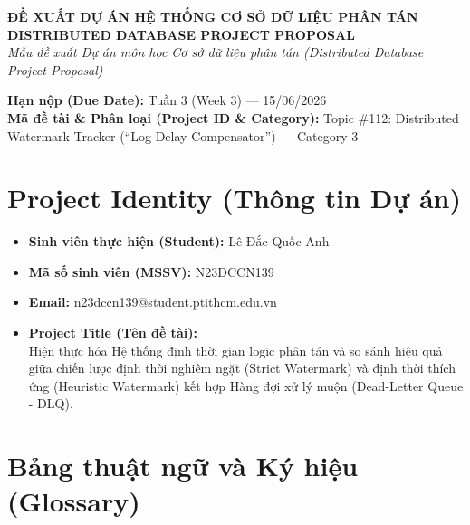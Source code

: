 \documentclass[12pt,a4paper]{article}
\begin{document}

\begin{center}
    \large\textbf{ĐỀ XUẤT DỰ ÁN HỆ THỐNG CƠ SỞ DỮ LIỆU PHÂN TÁN} \\[6pt]
    \Large\textbf{DISTRIBUTED DATABASE PROJECT PROPOSAL} \\[10pt]
    \small\textit{Mẫu đề xuất Dự án môn học Cơ sở dữ liệu phân tán (Distributed Database Project Proposal)}
\end{center}

\vspace{1cm}

\noindent\textbf{Hạn nộp (Due Date):} Tuần 3 (Week 3) --- 15/06/2026 \\
\noindent\textbf{Mã đề tài \& Phân loại (Project ID \& Category):} Topic \#112: Distributed Watermark Tracker (``Log Delay Compensator'') --- Category 3

\vspace{0.8cm}

\section{Project Identity (Thông tin Dự án)}
\begin{itemize}[leftmargin=*]
    \item \textbf{Sinh viên thực hiện (Student):} Lê Đắc Quốc Anh
    \item \textbf{Mã số sinh viên (MSSV):} N23DCCN139
    \item \textbf{Email:} n23dccn139@student.ptithcm.edu.vn
    \item \textbf{Project Title (Tên đề tài):} \\
    Hiện thực hóa Hệ thống định thời gian logic phân tán và so sánh hiệu quả giữa chiến lược định thời nghiêm ngặt (Strict Watermark) và định thời thích ứng (Heuristic Watermark) kết hợp Hàng đợi xử lý muộn (Dead-Letter Queue - DLQ).
\end{itemize}

\vspace{0.5cm}

\section{Bảng thuật ngữ và Ký hiệu (Glossary)}
\end{document}

